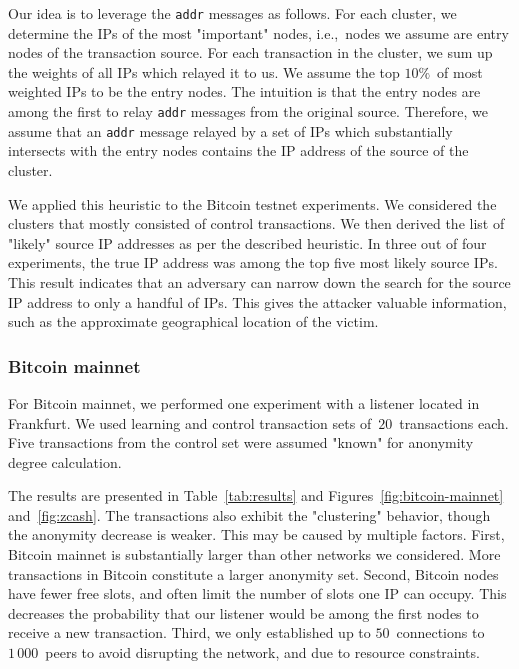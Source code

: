 Our idea is to leverage the \texttt{addr} messages as follows.
For each cluster, we determine the IPs of the most "important" nodes, i.e.,~nodes we assume are entry nodes of the transaction source.
For each transaction in the cluster, we sum up the weights of all IPs which relayed it to us.
We assume the top $10\%$~of most weighted IPs to be the entry nodes.
The intuition is that the entry nodes are among the first to relay \texttt{addr} messages from the original source.
Therefore, we assume that an \texttt{addr} message relayed by a set of IPs which substantially intersects with the entry nodes contains the IP address of the source of the cluster.

We applied this heuristic to the Bitcoin testnet experiments.
We considered the clusters that mostly consisted of control transactions.
We then derived the list of "likely" source IP addresses as per the described heuristic.
In three out of four experiments, the true IP address was among the top five most likely source IPs.
This result indicates that an adversary can narrow down the search for the source IP address to only a handful of IPs.
This gives the attacker valuable information, such as the approximate geographical location of the victim.

\subsubsection{Bitcoin mainnet}

For Bitcoin mainnet, we performed one experiment with a listener located in Frankfurt.
We used learning and control transaction sets of~$20$~transactions each.
Five transactions from the control set were assumed "known" for anonymity degree calculation.

The results are presented in Table~\ref{tab:results} and Figures~\ref{fig:bitcoin-mainnet} and~\ref{fig:zcash}.
The transactions also exhibit the "clustering" behavior, though the anonymity decrease is weaker.
This may be caused by multiple factors.
First, Bitcoin mainnet is substantially larger than other networks we considered.
More transactions in Bitcoin constitute a larger anonymity set.
Second, Bitcoin nodes have fewer free slots, and often limit the number of slots one IP can occupy.
This decreases the probability that our listener would be among the first nodes to receive a new transaction.
Third, we only established up to $50$~connections to $1\,000$~peers to avoid disrupting the network, and due to resource constraints.

